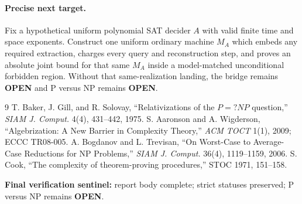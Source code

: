 \documentclass[11pt]{article}
\newcommand{\OPEN}{\textbf{OPEN}}
\begin{document}
\paragraph{Precise next target.}
Fix a hypothetical uniform polynomial SAT decider $A$ with valid finite time
and space exponents.  Construct one uniform ordinary machine $M_A$ which
embeds any required extraction, charges every query and reconstruction step,
and proves an absolute joint bound for that same $M_A$ inside a model-matched
unconditional forbidden region.  Without that same-realization landing, the
bridge remains \OPEN{} and P versus NP remains \OPEN.

\begin{thebibliography}{9}
 T. Baker, J. Gill, and R. Solovay,
``Relativizations of the $P=?NP$ question,'' \emph{SIAM J. Comput.} 4(4),
431--442, 1975.
 S. Aaronson and A. Wigderson,
``Algebrization: A New Barrier in Complexity Theory,'' \emph{ACM TOCT} 1(1),
2009; ECCC TR08-005.
 A. Bogdanov and L. Trevisan,
``On Worst-Case to Average-Case Reductions for NP Problems,''
\emph{SIAM J. Comput.} 36(4), 1119--1159, 2006.
 S. Cook, ``The complexity of theorem-proving procedures,''
STOC 1971, 151--158.
\end{thebibliography}

\noindent\textbf{Final verification sentinel:} report body complete; strict
statuses preserved; P versus NP remains \OPEN.
\end{document}

